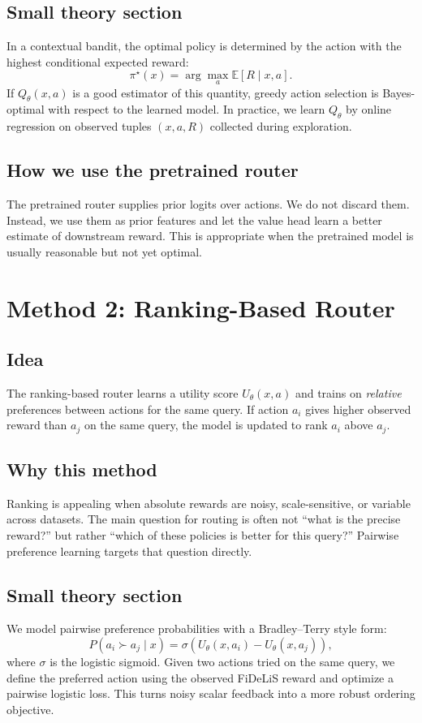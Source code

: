 \documentclass[11pt]{article}
\begin{document}
\subsection{Small theory section}
In a contextual bandit, the optimal policy is determined by the action with the highest conditional expected reward:
\[
\pi^\star(x) = \arg\max_a \mathbb{E}[R \mid x,a].
\]
If $Q_\theta(x,a)$ is a good estimator of this quantity, greedy action selection is Bayes-optimal with respect to the learned model. In practice, we learn $Q_\theta$ by online regression on observed tuples $(x,a,R)$ collected during exploration.

\subsection{How we use the pretrained router}
The pretrained router supplies prior logits over actions. We do not discard them. Instead, we use them as prior features and let the value head learn a better estimate of downstream reward. This is appropriate when the pretrained model is usually reasonable but not yet optimal.

\section{Method 2: Ranking-Based Router}
\subsection{Idea}
The ranking-based router learns a utility score $U_\theta(x,a)$ and trains on \emph{relative} preferences between actions for the same query. If action $a_i$ gives higher observed reward than $a_j$ on the same query, the model is updated to rank $a_i$ above $a_j$.

\subsection{Why this method}
Ranking is appealing when absolute rewards are noisy, scale-sensitive, or variable across datasets. The main question for routing is often not ``what is the precise reward?'' but rather ``which of these policies is better for this query?'' Pairwise preference learning targets that question directly.

\subsection{Small theory section}
We model pairwise preference probabilities with a Bradley--Terry style form:
\[
P(a_i \succ a_j \mid x) = \sigma(U_\theta(x,a_i) - U_\theta(x,a_j)),
\]
where $\sigma$ is the logistic sigmoid. Given two actions tried on the same query, we define the preferred action using the observed FiDeLiS reward and optimize a pairwise logistic loss. This turns noisy scalar feedback into a more robust ordering objective.
\end{document}
